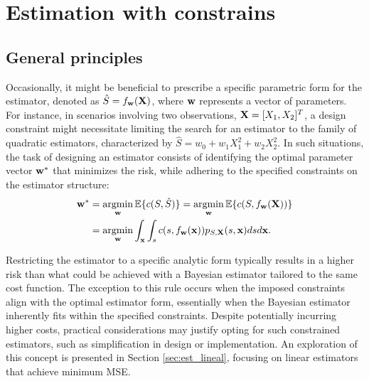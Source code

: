 \section{Estimation with constrains}


\subsection{General principles}

Occasionally, it might be beneficial to prescribe a specific parametric form for the estimator, denoted as $\hat S = f_{\bf w}(\bf X)$, where ${\bf w}$ represents a vector of parameters. For instance, in scenarios involving two observations, ${\bf X} = [X_1, X_2]^T$, a design constraint might necessitate limiting the search for an estimator to the family of quadratic estimators, characterized by $\hat S = w_0 + w_1 X_1^2 + w_2 X_2^2$. In such situations, the task of designing an estimator consists of identifying the optimal parameter vector ${\bf w}^*$ that minimizes the risk, while adhering to the specified constraints on the estimator structure:
\begin{align}
{\bf w}^* &= \operatorname*{argmin}_{\bf w} \mathbb{E}\{c(S,\hat S)\}
           = \operatorname*{argmin}_{\bf w} \mathbb{E}\{c(S,f_{\bf w}({\bf X}))\} \nonumber\\
          &= \operatorname*{argmin}_{\bf w} \int_{\bf x} \int_s c(s,f_{\bf w}({\bf x})) 
                                                 p_{S,{\bf X}}(s,{\bf x}) ds d{\bf x}.
\end{align}

Restricting the estimator to a specific analytic form typically results in a higher risk than what could be achieved with a Bayesian estimator tailored to the same cost function. The exception to this rule occurs when the imposed constraints align with the optimal estimator form, essentially when the Bayesian estimator inherently fits within the specified constraints. Despite potentially incurring higher costs, practical considerations may justify opting for such constrained estimators, such as simplification in design or implementation. An exploration of this concept is presented in Section \ref{sec:est_lineal}, focusing on linear estimators that achieve minimum MSE.

